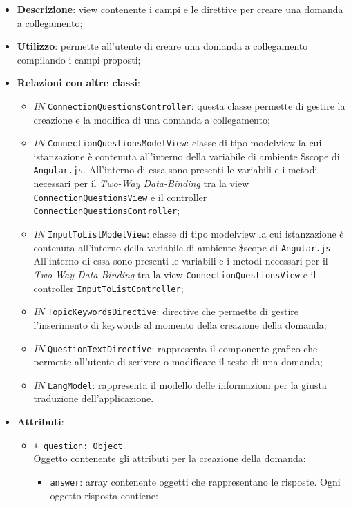 \begin{itemize}
	\item \textbf{Descrizione}: view contenente i campi e le direttive per creare una domanda a collegamento;
	\item \textbf{Utilizzo}: permette all'utente di creare una domanda a collegamento compilando i campi proposti;
	\item \textbf{Relazioni con altre classi}:
	\begin{itemize}
		\item \textit{IN} \texttt{ConnectionQuestionsController}: questa classe permette di gestire la creazione e la modifica di una domanda a collegamento;
		\item \textit{IN} \texttt{ConnectionQuestionsModelView}: classe di tipo modelview la cui istanzazione è contenuta all'interno della variabile di ambiente \$scope di \texttt{Angular.js}. All'interno di essa sono presenti le variabili e i metodi necessari per il \textit{Two-Way Data-Binding} tra la view \texttt{ConnectionQuestionsView} e il controller \texttt{ConnectionQuestionsController};
		\item \textit{IN} \texttt{InputToListModelView}: classe di tipo modelview la cui istanzazione è contenuta all'interno della variabile di ambiente \$scope di \texttt{Angular.js}. All'interno di essa sono presenti le variabili e i metodi necessari per il \textit{Two-Way Data-Binding} tra la view \texttt{ConnectionQuestionsView} e il controller \texttt{InputToListController};
		\item \textit{IN} \texttt{TopicKeywordsDirective}: directive che permette di gestire l'inserimento di keywords al momento della creazione della domanda;
		\item \textit{IN} \texttt{QuestionTextDirective}: rappresenta il componente grafico che permette all'utente di scrivere o modificare il testo di una domanda;
		\item \textit{IN} \texttt{LangModel}: rappresenta il modello delle informazioni per la giusta traduzione dell'applicazione.
	\end{itemize}
	\item \textbf{Attributi}:
	\begin{itemize}
		\item \texttt{+ question: Object} \\ Oggetto contenente gli attributi per la creazione della domanda:
		\begin{itemize}
			\item \texttt{answer}: array contenente oggetti che rappresentano le risposte. Ogni oggetto risposta contiene:

\end{itemize}
\end{itemize}
\end{itemize}

